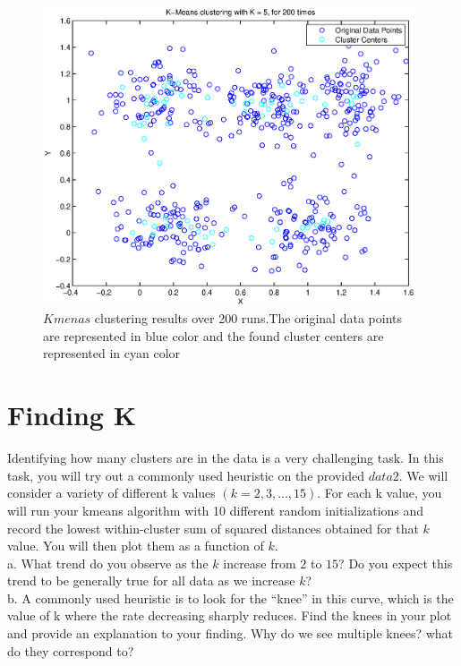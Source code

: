\documentclass{article} %
\begin{document}
\begin{figure}[h]
\begin{center}
\includegraphics[width=11cm]{Fig/fig_Kmeans_with_random_initialization.eps}
 \end{center}
\caption{\small{$Kmenas$ clustering results over 200 runs.The original data points are represented in blue color and the found cluster centers are represented in cyan color}} 
\label{fig:fig_Kmeans_with_random_initialization}
\end{figure}


\section{Finding K }
Identifying how many clusters are in the data is a very challenging task. In this task, you will try out a commonly used heuristic on the provided $data2$. We will consider a variety of different k values $\left(k = 2, 3, ..., 15\right)$. For each k value, you will run your kmeans algorithm with 10 different random initializations and record the lowest within-cluster sum of squared distances obtained for that $k$ value. You will then plot them as a function of $k$.\\
a. What trend do you observe as the $k$ increase from $2$ to $15$? Do you expect this trend to be generally true for all data as we increase $k$?\\
b. A commonly used heuristic is to look for the “knee” in this curve, which is the value of k where the rate decreasing sharply reduces. Find the knees in your plot and provide an explanation to your finding. Why do we see multiple knees? what do they correspond to?\\
\end{document}
